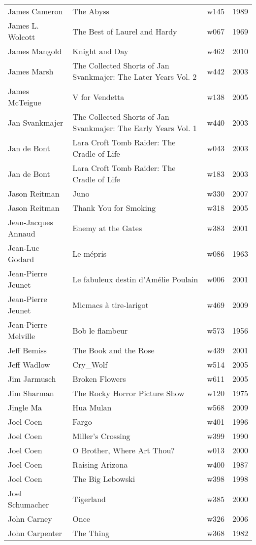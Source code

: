 \documentclass{article}
\begin{document}
\begin {center}
\begin{longtable}{l p{10cm} l l}
James Cameron & The Abyss & w145 & 1989 \\
James L. Wolcott & The Best of Laurel and Hardy & w067 & 1969 \\
James Mangold & Knight and Day & w462 & 2010 \\
James Marsh & The Collected Shorts of Jan Svankmajer: The Later Years Vol. 2 & w442 & 2003 \\
James McTeigue & V for Vendetta & w138 & 2005 \\
Jan Svankmajer & The Collected Shorts of Jan Svankmajer: The Early Years Vol. 1 & w440 & 2003 \\
Jan de Bont & Lara Croft Tomb Raider: The Cradle of Life & w043 & 2003 \\
Jan de Bont & Lara Croft Tomb Raider: The Cradle of Life & w183 & 2003 \\
Jason Reitman & Juno & w330 & 2007 \\
Jason Reitman & Thank You for Smoking & w318 & 2005 \\
Jean-Jacques Annaud & Enemy at the Gates & w383 & 2001 \\
Jean-Luc Godard & Le mépris & w086 & 1963 \\
Jean-Pierre Jeunet & Le fabuleux destin d'Amélie Poulain & w006 & 2001 \\
Jean-Pierre Jeunet & Micmacs à tire-larigot & w469 & 2009 \\
Jean-Pierre Melville & Bob le flambeur & w573 & 1956 \\
Jeff Bemiss & The Book and the Rose & w439 & 2001 \\
Jeff Wadlow & Cry\_Wolf & w514 & 2005 \\
Jim Jarmusch & Broken Flowers & w611 & 2005 \\
Jim Sharman & The Rocky Horror Picture Show & w120 & 1975 \\
Jingle Ma & Hua Mulan & w568 & 2009 \\
Joel Coen & Fargo & w401 & 1996 \\
Joel Coen & Miller's Crossing & w399 & 1990 \\
Joel Coen & O Brother, Where Art Thou? & w013 & 2000 \\
Joel Coen & Raising Arizona & w400 & 1987 \\
Joel Coen & The Big Lebowski & w398 & 1998 \\
Joel Schumacher & Tigerland & w385 & 2000 \\
John Carney & Once & w326 & 2006 \\
John Carpenter & The Thing & w368 & 1982 \\

\end{longtable}
\end{center}
\end{document}
